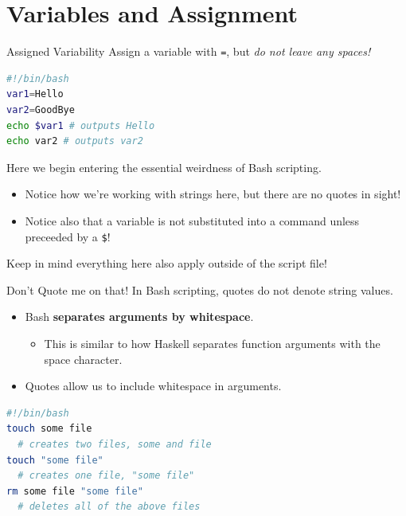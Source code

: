 \documentclass[11pt]{beamer}
\begin{document}
\section[Basics]{Variables and Assignment}
\begin{frame}[fragile=singleslide]{Assigned Variability}
Assign a variable with \texttt{=}, but \emph{do not leave any spaces!}
\begin{lstlisting}[style=terminal, language=bash]
#!/bin/bash
var1=Hello
var2=GoodBye
echo $var1 # outputs Hello
echo var2 # outputs var2
\end{lstlisting}
Here we begin entering the essential weirdness of Bash scripting.  
\begin{itemize}
\item Notice how we're working with strings here, but there are no quotes in sight! 
\item Notice also that a variable is not substituted into a command unless preceeded by a \texttt{\$}!
\end{itemize}
Keep in mind everything here also apply outside of the script file! 
\end{frame}

\begin{frame}[fragile=singleslide]{Don't Quote me on that!}
In Bash scripting, quotes do not denote string values.
\begin{itemize}
\item Bash \textbf{separates arguments by whitespace}.
	\begin{itemize}
	\item This is similar to how Haskell separates function arguments with the space character.  
	\end{itemize}
\item Quotes allow us to include whitespace in arguments.
\end{itemize}
\begin{lstlisting}[style=terminal, language=bash]
#!/bin/bash
touch some file 
  # creates two files, some and file
touch "some file" 
  # creates one file, "some file"
rm some file "some file" 
  # deletes all of the above files 
\end{lstlisting}
\end{frame}
\end{document}
